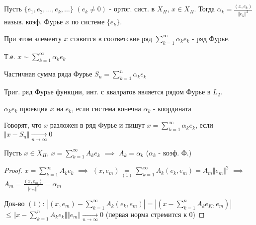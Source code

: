 \documentclass{article}
\begin{document}
\begin{definition}
  Пусть $\{e_1,e_2,\dots ,e_k,\dots \}$ $(e_k\neq 0)$ - ортог. сист. в $X_\Pi$,
  $x\in X_\Pi$. Тогда $\alpha_k=\frac{(x,e_k)}{\Vert e_k \Vert^{2}}$ назыв.
  коэф. Фурье $x$ по системе $\{e_k\}$.

  При этом элементу $x$ ставится в соответсвие ряд $\sum_{k=1}^{\infty}\alpha_ke_k$
  - ряд Фурье.

  Т.е. $x \sim \sum_{k=1}^{\infty}\alpha_ke_k$
\end{definition}
\begin{definition}
  Частичная сумма ряда Фурье $S_n=\sum_{k=1}^{n}\alpha_ke_k$
\end{definition}
\begin{remark}
  Триг. ряд Фурье функции, инт. с квалратов является рядом Фурье в $L_2$.
\end{remark}
\begin{remark}
  $\alpha_ke_k$ проекция $x$ на $e_k$, если система конечна $\alpha_k$ - координата
\end{remark}
\begin{definition}
  Говорят, что $x$ разложен в ряд Фурье и пишут $x=\sum_{k=1}^{\infty}\alpha_ke_k$,
  если $\Vert x-S_n \Vert \underset{n\to\infty}{\to} 0$
\end{definition}
\begin{theorem}[Т1]
  Пусть $x \in X_\Pi$, $x=\sum_{k=1}^{\infty}A_ke_k$ $\implies$ $A_k=\alpha_k$ ($\alpha_k$ - коэф. Ф.)
\end{theorem}
\begin{proof}
  $x=\sum_{k=1}^{\infty}A_ke_k$ $\implies$ $(x,e_m)\underset{(1)}{=}\sum_{k=1}^{\infty}A_k(e_k,e_m)=A_m\Vert e_m \Vert^{2}$
  $\implies$ $A_m=\frac{(x,e_m)}{\Vert e_m \Vert^{2}}=\alpha_m$

  Док-во $(1)$: $|(x,e_m) - \sum_{k=1}^{\infty}A_k(e_k,e_m)|=|(x-\sum_{k=1}^{n}A_ke_K,e_m)|$
  $\le \Vert x-\sum_{k=1}^{n}A_ke_k \Vert \Vert e_m \Vert \underset{n\to\infty}{\to}0$
  (первая норма стремится к 0)
\end{proof}

\end{document}
